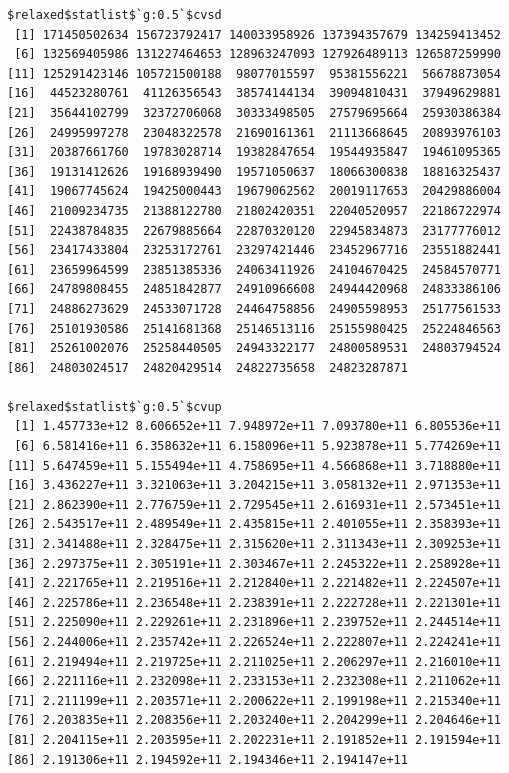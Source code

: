 \documentclass[
]{article}
\begin{document}
\begin{verbatim}
$relaxed$statlist$`g:0.5`$cvsd
 [1] 171450502634 156723792417 140033958926 137394357679 134259413452
 [6] 132569405986 131227464653 128963247093 127926489113 126587259990
[11] 125291423146 105721500188  98077015597  95381556221  56678873054
[16]  44523280761  41126356543  38574144134  39094810431  37949629881
[21]  35644102799  32372706068  30333498505  27579695664  25930386384
[26]  24995997278  23048322578  21690161361  21113668645  20893976103
[31]  20387661760  19783028714  19382847654  19544935847  19461095365
[36]  19131412626  19168939490  19571050637  18066300838  18816325437
[41]  19067745624  19425000443  19679062562  20019117653  20429886004
[46]  21009234735  21388122780  21802420351  22040520957  22186722974
[51]  22438784835  22679885664  22870320120  22945834873  23177776012
[56]  23417433804  23253172761  23297421446  23452967716  23551882441
[61]  23659964599  23851385336  24063411926  24104670425  24584570771
[66]  24789808455  24851842877  24910966608  24944420968  24833386106
[71]  24886273629  24533071728  24464758856  24905598953  25177561533
[76]  25101930586  25141681368  25146513116  25155980425  25224846563
[81]  25261002076  25258440505  24943322177  24800589531  24803794524
[86]  24803024517  24820429514  24822735658  24823287871

$relaxed$statlist$`g:0.5`$cvup
 [1] 1.457733e+12 8.606652e+11 7.948972e+11 7.093780e+11 6.805536e+11
 [6] 6.581416e+11 6.358632e+11 6.158096e+11 5.923878e+11 5.774269e+11
[11] 5.647459e+11 5.155494e+11 4.758695e+11 4.566868e+11 3.718880e+11
[16] 3.436227e+11 3.321063e+11 3.204215e+11 3.058132e+11 2.971353e+11
[21] 2.862390e+11 2.776759e+11 2.729545e+11 2.616931e+11 2.573451e+11
[26] 2.543517e+11 2.489549e+11 2.435815e+11 2.401055e+11 2.358393e+11
[31] 2.341488e+11 2.328475e+11 2.315620e+11 2.311343e+11 2.309253e+11
[36] 2.297375e+11 2.305191e+11 2.303467e+11 2.245322e+11 2.258928e+11
[41] 2.221765e+11 2.219516e+11 2.212840e+11 2.221482e+11 2.224507e+11
[46] 2.225786e+11 2.236548e+11 2.238391e+11 2.222728e+11 2.221301e+11
[51] 2.225090e+11 2.229261e+11 2.231896e+11 2.239752e+11 2.244514e+11
[56] 2.244006e+11 2.235742e+11 2.226524e+11 2.222807e+11 2.224241e+11
[61] 2.219494e+11 2.219725e+11 2.211025e+11 2.206297e+11 2.216010e+11
[66] 2.221116e+11 2.232098e+11 2.233153e+11 2.232308e+11 2.211062e+11
[71] 2.211199e+11 2.203571e+11 2.200622e+11 2.199198e+11 2.215340e+11
[76] 2.203835e+11 2.208356e+11 2.203240e+11 2.204299e+11 2.204646e+11
[81] 2.204115e+11 2.203595e+11 2.202231e+11 2.191852e+11 2.191594e+11
[86] 2.191306e+11 2.194592e+11 2.194346e+11 2.194147e+11


\end{verbatim}
\end{document}
